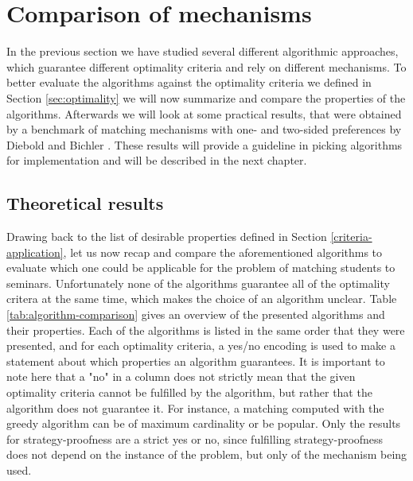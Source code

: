 \section{Comparison of mechanisms}
In the previous section we have studied several different algorithmic approaches, which guarantee different optimality criteria and rely on different mechanisms. To better evaluate the algorithms against the optimality criteria we defined in Section \ref{sec:optimality} we will now summarize and compare the properties of the algorithms. Afterwards we will look at some practical results, that were obtained by a benchmark of matching mechanisms with one- and two-sided preferences by Diebold and Bichler \cite{DieboldBenchmark}. These results will provide a guideline in picking algorithms for implementation and will be described in the next chapter.

\subsection{Theoretical results}
Drawing back to the list of desirable properties defined in Section \ref{criteria-application}, let us now recap and compare the aforementioned algorithms to evaluate which one could be applicable for the problem of matching students to seminars. Unfortunately none of the algorithms guarantee all of the optimality critera at the same time, which makes the choice of an algorithm unclear. Table \ref{tab:algorithm-comparison} gives an overview of the presented algorithms and their properties. Each of the algorithms is listed in the same order that they were presented, and for each optimality criteria, a yes/no encoding is used to make a statement about which properties an algorithm guarantees. It is important to note here that a "no" in a column does not strictly mean that the given optimality criteria cannot be fulfilled by the algorithm, but rather that the algorithm does not guarantee it. For instance, a matching computed with the greedy algorithm can be of maximum cardinality or be popular. Only the results for strategy-proofness are a strict yes or no, since fulfilling strategy-proofness does not depend on the instance of the problem, but only of the mechanism being used. 

